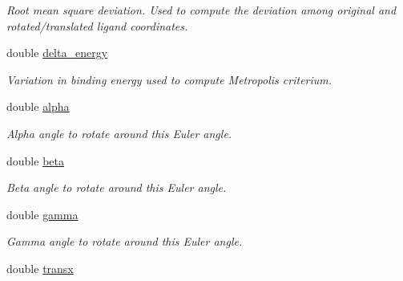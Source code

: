 \begin{DoxyCompactItemize}
\begin{DoxyCompactList}\small\item\em Root mean square deviation. Used to compute the deviation among original and rotated/translated ligand coordinates. \item\end{DoxyCompactList}\item 
\hypertarget{classCOORD__MC_aa86b929ad05eaf8bb81ab53976d143f7}{
double \hyperlink{classCOORD__MC_aa86b929ad05eaf8bb81ab53976d143f7}{delta\_\-energy}}
\label{classCOORD__MC_aa86b929ad05eaf8bb81ab53976d143f7}

\begin{DoxyCompactList}\small\item\em Variation in binding energy used to compute Metropolis criterium. \item\end{DoxyCompactList}\item 
\hypertarget{classCOORD__MC_a80872e7f1fedc71b060472be6565e83a}{
double \hyperlink{classCOORD__MC_a80872e7f1fedc71b060472be6565e83a}{alpha}}
\label{classCOORD__MC_a80872e7f1fedc71b060472be6565e83a}

\begin{DoxyCompactList}\small\item\em Alpha angle to rotate around this Euler angle. \item\end{DoxyCompactList}\item 
\hypertarget{classCOORD__MC_a60fa21206cc164282a8d7b4e45b322c2}{
double \hyperlink{classCOORD__MC_a60fa21206cc164282a8d7b4e45b322c2}{beta}}
\label{classCOORD__MC_a60fa21206cc164282a8d7b4e45b322c2}

\begin{DoxyCompactList}\small\item\em Beta angle to rotate around this Euler angle. \item\end{DoxyCompactList}\item 
\hypertarget{classCOORD__MC_a67fa08c5c5dddf4cf3b5d01789124892}{
double \hyperlink{classCOORD__MC_a67fa08c5c5dddf4cf3b5d01789124892}{gamma}}
\label{classCOORD__MC_a67fa08c5c5dddf4cf3b5d01789124892}

\begin{DoxyCompactList}\small\item\em Gamma angle to rotate around this Euler angle. \item\end{DoxyCompactList}\item 
\hypertarget{classCOORD__MC_acc43aa187cde8621749a6297895906b5}{
double \hyperlink{classCOORD__MC_acc43aa187cde8621749a6297895906b5}{transx}}
\label{classCOORD__MC_acc43aa187cde8621749a6297895906b5}


\end{DoxyCompactItemize}

